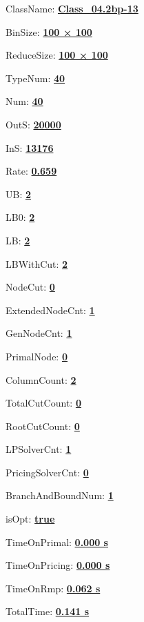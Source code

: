 \documentclass[11pt]{article}
\begin{document}
\pagestyle{empty}


ClassName: \underline{\textbf{Class_04.2bp-13}}
\par
BinSize: \underline{\textbf{100 × 100}}
\par
ReduceSize: \underline{\textbf{100 × 100}}
\par
TypeNum: \underline{\textbf{40}}
\par
Num: \underline{\textbf{40}}
\par
OutS: \underline{\textbf{20000}}
\par
InS: \underline{\textbf{13176}}
\par
Rate: \underline{\textbf{0.659}}
\par
UB: \underline{\textbf{2}}
\par
LB0: \underline{\textbf{2}}
\par
LB: \underline{\textbf{2}}
\par
LBWithCut: \underline{\textbf{2}}
\par
NodeCut: \underline{\textbf{0}}
\par
ExtendedNodeCnt: \underline{\textbf{1}}
\par
GenNodeCnt: \underline{\textbf{1}}
\par
PrimalNode: \underline{\textbf{0}}
\par
ColumnCount: \underline{\textbf{2}}
\par
TotalCutCount: \underline{\textbf{0}}
\par
RootCutCount: \underline{\textbf{0}}
\par
LPSolverCnt: \underline{\textbf{1}}
\par
PricingSolverCnt: \underline{\textbf{0}}
\par
BranchAndBoundNum: \underline{\textbf{1}}
\par
isOpt: \underline{\textbf{true}}
\par
TimeOnPrimal: \underline{\textbf{0.000 s}}
\par
TimeOnPricing: \underline{\textbf{0.000 s}}
\par
TimeOnRmp: \underline{\textbf{0.062 s}}
\par
TotalTime: \underline{\textbf{0.141 s}}
\par
\newpage
\end{document}
